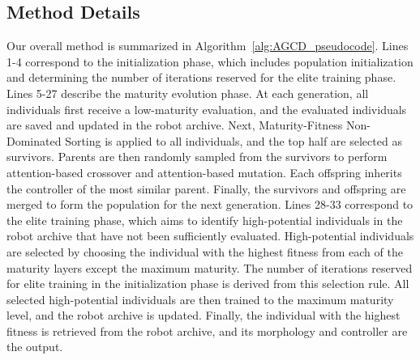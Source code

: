 \documentclass{article}
\begin{document}
    \subsection{Method Details}
    Our overall method is summarized in Algorithm~\ref{alg:AGCD_pseudocode}. Lines
    1-4 correspond to the initialization phase, which includes population
    initialization and determining the number of iterations reserved for the
    elite training phase. Lines 5-27 describe the maturity evolution phase. At
    each generation, all individuals first receive a low-maturity evaluation,
    and the evaluated individuals are saved and updated in the robot archive. Next,
    Maturity-Fitness Non-Dominated Sorting is applied to all individuals, and the
    top half are selected as survivors. Parents are then randomly sampled from
    the survivors to perform attention-based crossover and attention-based
    mutation. Each offspring inherits the controller of the most similar parent.
    Finally, the survivors and offspring are merged to form the population for the
    next generation. Lines 28-33 correspond to the elite training phase, which aims
    to identify high-potential individuals in the robot archive that have not been
    sufficiently evaluated. High-potential individuals are selected by choosing
    the individual with the highest fitness from each of the maturity layers
    except the maximum maturity. The number of iterations reserved for elite training
    in the initialization phase is derived from this selection rule. All
    selected high-potential individuals are then trained to the maximum maturity
    level, and the robot archive is updated. Finally, the individual with the highest
    fitness is retrieved from the robot archive, and its morphology and
    controller are the output.
    \clearpage
\end{document}
